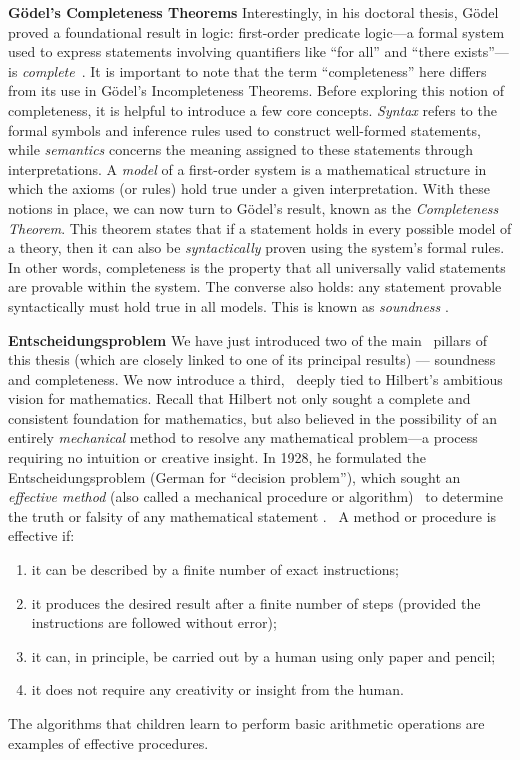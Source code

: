 \noindent \textbf{ Gödel’s Completeness Theorems} 
Interestingly, in his doctoral thesis, Gödel proved a foundational result in logic: first-order predicate logic---a formal system used to express statements involving quantifiers like ``for all'' and ``there exists''---is \emph{complete}~\cite{godelVollstandigkeitAxiomeLogischen1930}. It is important to note that the term ``completeness'' here differs from its use in Gödel’s Incompleteness Theorems.
Before exploring this notion of completeness, it is helpful to introduce a few core concepts. \emph{Syntax} refers to the formal symbols and inference rules used to construct well-formed statements, while \emph{semantics} concerns the meaning assigned to these statements through interpretations. A \emph{model} of a first-order system is a mathematical structure in which the axioms (or rules) hold true under a given interpretation.
With these notions in place, we can now turn to Gödel’s result, known as the \emph{Completeness Theorem}. This theorem states that  if a statement holds in every possible model of a theory, then it can also be \emph{syntactically} proven using the system’s formal rules. In other words, completeness is the property that all universally valid statements are provable within the system.  The converse also holds: any statement provable syntactically must hold true in all models. This is known as \emph{soundness} \cite{franzenGodelsTheorem2008}.
 


\noindent \textbf{Entscheidungsproblem}
We have just introduced two of the main  pillars of this thesis  (which are closely linked to one of its principal results) ---
soundness and completeness. We now introduce a third,  deeply tied to Hilbert's ambitious vision for mathematics. Recall that Hilbert not only sought a complete and consistent foundation for mathematics, but also believed in the possibility of an entirely \emph{mechanical} method to resolve any mathematical problem---a process requiring no intuition or creative insight. In 1928, he formulated the Entscheidungsproblem (German for “decision problem”), which sought an \emph{effective method} (also called a mechanical procedure or algorithm)  to determine the truth or falsity of any mathematical statement \cite{hilbert1928}.  A method or procedure is effective if:
\begin{enumerate}
\item it can be described by a finite number of exact instructions;
\item it produces the desired result after a finite number of steps (provided the instructions are followed without error);
\item it can, in principle, be carried out by a human using only paper and pencil;
\item it does not require any creativity or insight from the human.
\end{enumerate}
The algorithms that children learn to perform basic arithmetic operations are examples of effective procedures. 

